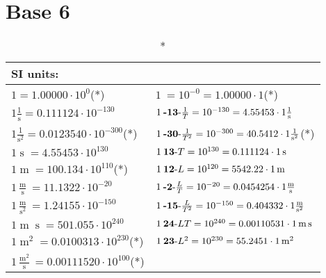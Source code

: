 
\chapter{Base 6}
\begin{center}\begin{longtable}{l l}
\caption*{SI units: }\\
\hline{\color{black}$1 \bm{\mathrm{ }} = 1.00000\cdot10^{0} $}\quad(*)&
	{\color{black}$1\:\text{} =10^{-0} = 1.00000 \cdot 1 \bm{\mathrm{ }}$}\quad(*)\\
{\color{black}$1 \bm{\mathrm{ }}\frac1{\operatorname{s}} = 0.111124\cdot10^{-130} $}&
	{\color{black}$1\:\text{\textbf{-13}-} \frac1{T}=10^{-130} = 4.55453 \cdot 1 \bm{\mathrm{ }}\frac1{\operatorname{s}}$}\\
{\color{black}$1 \bm{\mathrm{ }}\frac1{\operatorname{s}^2} = 0.0123540\cdot10^{-300} $}\quad(*)&
	{\color{black}$1\:\text{\textbf{-30}-} \frac1{T^2}=10^{-300} = 40.5412 \cdot 1 \bm{\mathrm{ }}\frac1{\operatorname{s}^2}$}\quad(*)\\
{\color{black}$1 \bm{\mathrm{ }}\operatorname{s} = 4.55453\cdot10^{130} $}&
	{\color{black}$1\:\text{\textbf{13}-} T=10^{130} = 0.111124 \cdot 1 \bm{\mathrm{ }}\operatorname{s}$}\\
{\color{black}$1 \bm{\mathrm{ }}\operatorname{m} = 100.134\cdot10^{110} $}\quad(*)&
	{\color{black}$1\:\text{\textbf{12}-} L=10^{120} = 5542.22 \cdot 1 \bm{\mathrm{ }}\operatorname{m}$}\\
{\color{black}$1 \bm{\mathrm{ }}\frac{\operatorname{m}}{\operatorname{s}} = 11.1322\cdot10^{-20} $}&
	{\color{black}$1\:\text{\textbf{-2}-} \frac{L}{T}=10^{-20} = 0.0454254 \cdot 1 \bm{\mathrm{ }}\frac{\operatorname{m}}{\operatorname{s}}$}\\
{\color{black}$1 \bm{\mathrm{ }}\frac{\operatorname{m}}{\operatorname{s}^2} = 1.24155\cdot10^{-150} $}&
	{\color{black}$1\:\text{\textbf{-15}-} \frac{L}{T^2}=10^{-150} = 0.404332 \cdot 1 \bm{\mathrm{ }}\frac{\operatorname{m}}{\operatorname{s}^2}$}\\
{\color{black}$1 \bm{\mathrm{ }}\operatorname{m}\operatorname{s} = 501.055\cdot10^{240} $}&
	{\color{black}$1\:\text{\textbf{24}-} LT=10^{240} = 0.00110531 \cdot 1 \bm{\mathrm{ }}\operatorname{m}\operatorname{s}$}\\
{\color{black}$1 \bm{\mathrm{ }}\operatorname{m}^2 = 0.0100313\cdot10^{230} $}\quad(*)&
	{\color{black}$1\:\text{\textbf{23}-} L^2=10^{230} = 55.2451 \cdot 1 \bm{\mathrm{ }}\operatorname{m}^2$}\\
{\color{black}$1 \bm{\mathrm{ }}\frac{\operatorname{m}^2}{\operatorname{s}} = 0.00111520\cdot10^{100} $}\quad(*)&

\end{longtable}
\end{center}
